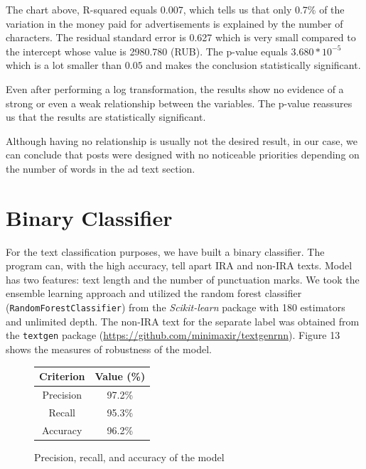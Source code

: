 \documentclass{article}
\begin{document}
The chart above, R-squared equals 0.007, which tells us that only 0.7\%
of the variation in the money paid for advertisements is explained by the
number of characters. The residual standard error is 0.627 which is very small
compared to the intercept whose value is 2980.780 (RUB). The p-value equals
$3.680 * 10^{-5}$ which is a lot smaller than $0.05$ and makes the conclusion
statistically significant.

\medskip

Even after performing a log transformation, the results show no evidence of a
strong or even a weak relationship between the variables. The p-value reassures
us that the results are statistically significant.

\medskip

Although having no relationship is usually not the desired result, in our case,
we can conclude that posts were designed with no noticeable priorities
depending on the number of words in the ad text section.


\section{Binary Classifier}

For the text classification purposes, we have built a binary classifier. The
program can, with the high accuracy, tell apart IRA and non-IRA texts. Model
has two features: text length and the number of punctuation marks. We took the
ensemble learning approach and utilized the random forest classifier
(\texttt{RandomForestClassifier}) from the \textit{Scikit-learn} package with
180 estimators and unlimited depth. The non-IRA text for the separate label was
obtained from the \texttt{textgen} package
(\url{https://github.com/minimaxir/textgenrnn}). Figure 13 shows the measures
of robustness of the model.

\begin{figure}[H]
  \centering
  \begin{tabular}{*{2}{c}}
    \toprule
    Criterion & Value (\%)\\
    \midrule
    Precision & 97.2\%\\
    \midrule
    Recall    & 95.3\%\\
    \midrule
    Accuracy  & 96.2\%\\
    \bottomrule
  \end{tabular}
  \caption{Precision, recall, and accuracy of the model}
\end{figure}
\end{document}
